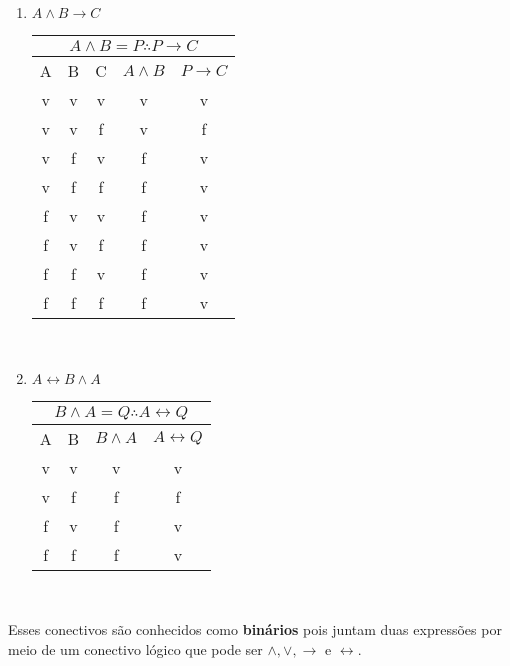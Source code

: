 \begin{multicols}{2}
	\setlength{\columnseprule}{.5pt}
	\begin{enumerate}[label=\alph*)]
		\item $ A \wedge B \rightarrow C $
		
		\begin{tabular}{|c|c|c|c|c|}
			\hline 
			\multicolumn{5}{|c|}{ $ A \wedge B = P \therefore P \rightarrow C $} \\ 
			\hline 
			A	& B & C & $ A \wedge B $ & $ P \rightarrow C $ \\ 
			\hline 
			v	& v & v & v & v \\ 
			\hline 
			v	& v & f & v & f \\ 
			\hline 
			v	& f & v & f & v \\ 
			\hline 
			v	& f & f & f & v \\ 
			\hline 
			f	& v & v & f & v \\
			\hline 
			f	& v & f & f & v \\
			\hline 
			f	& f & v & f & v \\
			\hline 
			f	& f & f & f & v \\
			\hline 
		\end{tabular} \\
		\columnbreak
		
		\item $ A \leftrightarrow B \wedge A $ 
		
		\begin{tabular}{|c|c|c|c|}
			\hline 
			\multicolumn{4}{|c|}{ $ B \wedge A = Q \therefore A \leftrightarrow Q $} \\ 
			\hline 
			A	& B & $ B \wedge A $ & $ A \leftrightarrow Q $ \\ 
			\hline 
			v	& v & v & v \\ 
			\hline 
			v	& f & f & f \\ 
			\hline 
			f	& v & f & v \\
			\hline 
			f	& f & f & v \\
			\hline 
		\end{tabular} \\
	\end{enumerate}
\end{multicols}

\pagebreak

Esses conectivos são conhecidos como \textbf{binários} pois juntam duas expressões por meio de um conectivo lógico que pode ser $ \wedge, \vee, \rightarrow $ e $ \leftrightarrow $.

